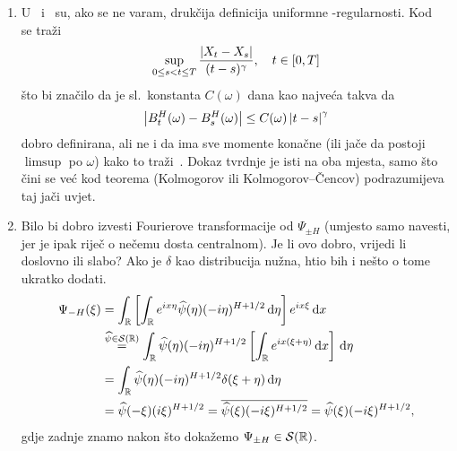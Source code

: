\documentclass[main.tex]{subfiles}
\begin{document}
\begin{enumerate}
	\item U~\cite[str.~16.]{ayache} i~\cite[str.~3.]{se}
	      su, ako se ne varam, drukčija definicija uniformne \holder -regularnosti.
	      Kod~\cite{se} se traži
	      \begin{equation}
		      \sup\limits_{0 \le s < t \le T} \frac{\left| {X_t-X_s} \right|}{(t-s)^\gamma}, \quad t \in [0,T]
	      \end{equation}
	      što bi značilo da je sl.\ konstanta \( C(\omega) \) dana kao najveća takva da
	      \begin{equation}
		      \left| {B^H_{t}(\omega)-B^H_s(\omega)} \right| \le C(\omega) \left| {t-s} \right|^\gamma
	      \end{equation}
	      dobro definirana, ali ne i da ima sve momente konačne (ili jače da postoji \( \limsup \) po \( \omega \)) kako to traži~\cite{ayache}. Dokaz tvrdnje je isti na oba mjesta, samo
	      što~\cite{ayache} čini se već kod teorema (Kolmogorov ili Kolmogorov--Čencov)
	      podrazumijeva taj jači uvjet.

	\item Bilo bi dobro izvesti Fourierove transformacije
	      od \( \Psi_{\pm H} \) (umjesto samo navesti, jer je ipak riječ o nečemu dosta centralnom). Je li ovo dobro, vrijedi li
	      doslovno ili slabo? Ako je \( \delta \) kao distribucija
	      nužna, htio bih i nešto o tome ukratko dodati.
	      \begin{align}
		      \Psi_{-H}(\xi) & = \int_{\mathbb{R}} \left[ \int_{\mathbb{R}} e^{ix\eta} \widehat{\psi}(\eta) (-i\eta)^{H+1/2} \,\mathrm d \eta \right]
		      e^{ix\xi} \,\mathrm d x                                                                                       \\
		                     & \stackrel{\widehat{\psi} \in \mathcal S(\mathbb{R})}{=}
		      \int_{\mathbb{R}} \widehat{\psi}(\eta) (-i\eta)^{H+1/2} \left[ \int_{\mathbb{R}} e^{ix(\xi+\eta)}  \,\mathrm d x\right] \,\mathrm d \eta         \\
		                     & = \int_{\mathbb{R}} \widehat{\psi}(\eta) (-i\eta)^{H+1/2} \delta(\xi + \eta) \,\mathrm d \eta                \\ &= \widehat{\psi}(-\xi)(i\xi)^{H+1/2}
		      = \overline{\widehat{\psi}(\xi) (-i\xi)^{H+1/2}} = \widehat{\psi}(\xi) (-i\xi)^{H+1/2},
	      \end{align}
	      gdje zadnje znamo nakon što dokažemo \( \Psi_{\pm H} \in \mathcal S(\mathbb{R}) \).
\end{enumerate}
\end{document}
